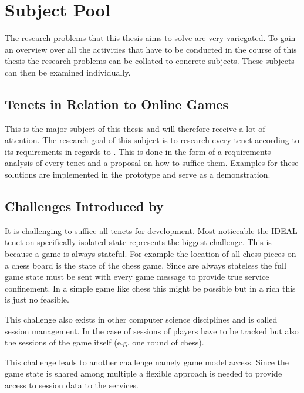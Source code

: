 \section{Subject Pool}
\label{sec:subject_pool}

The research problems that this thesis aims to solve are very variegated. To
gain an overview over all the activities that have to be conducted in the course
of this thesis the research problems can be collated to concrete subjects. These
subjects can then be examined individually.

\subsection{\ms{} Tenets in Relation to Online Games}

This is the major subject of this thesis and will therefore receive a lot of
attention. The research goal of this subject is to research every \ms{} tenet
according to its requirements in regards to \ogs{}. This is done in the form of
a requirements analysis of every tenet and a proposal on how to suffice them.
Examples for these solutions are implemented in the prototype and serve as a
demonstration. 

\subsection{Challenges Introduced by \mss{}}

It is challenging to suffice all \ms{} tenets for \og{} development. Most
noticeable the IDEAL tenet on specifically isolated state represents the biggest
challenge. This is because a game is always stateful. For example the location
of all chess pieces on a chess board is the state of the chess game. Since
\mss{} are always stateless the full game state must be sent with every game
message to provide true service confinement. In a simple game like chess this
might be possible but in a rich \og{} this is just no feasible. 

This challenge also exists in other computer science disciplines and is called
session management. In the case of \ogs{} sessions of players have to be
tracked but also the sessions of the game itself (e.g. one round of chess).

This challenge leads to another challenge namely game model access. Since the
game state is shared among multiple \mss{} a flexible approach is needed to
provide access to session data to the services.

